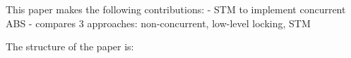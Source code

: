 This paper makes the following contributions:
- STM to implement concurrent ABS 
- compares 3 approaches: non-concurrent, low-level locking, STM

The structure of the paper is:
